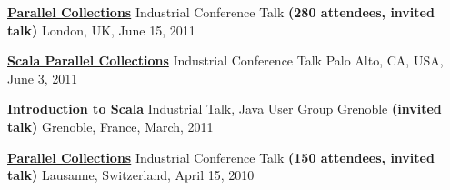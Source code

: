 \documentclass[9pt]{article}
\begin{document}
\noindent\href{https://skillsmatter.com/skillscasts/2236-parallel-collections}
{\bf Parallel Collections}
\vspace{-0.03in}
\newline\noindent Industrial Conference Talk \textbf{(280 attendees, invited talk)}
\dates{}
\linebreak\noindent London, UK, June 15, 2011
\bigskip

\noindent
\href{http://days2011.scala-lang.org/node/138/272/29.%20Parallel%20Collections.mp4}
{\bf Scala Parallel Collections}
\vspace{-0.03in}
\newline\noindent Industrial Conference Talk
\dates{}
\linebreak\noindent Palo Alto, CA, USA, June 3, 2011
\bigskip

\noindent
\href{http://www.slideshare.net/AleksandarProkopec/introduction-to-scala-39540464}
{\bf Introduction to Scala}
\vspace{-0.03in}
\newline\noindent Industrial Talk, Java User Group Grenoble \textbf{(invited talk)}
\dates{}
\linebreak\noindent Grenoble, France, March, 2011
\bigskip

\noindent\href{http://days2010.scala-lang.org/node/138/140/}
{\bf Parallel Collections}
\vspace{-0.03in}
\newline\noindent Industrial Conference Talk \textbf{(150 attendees, invited talk)}
\dates{}
\linebreak\noindent Lausanne, Switzerland, April 15, 2010
\bigskip



\bigskip



\end{document}
